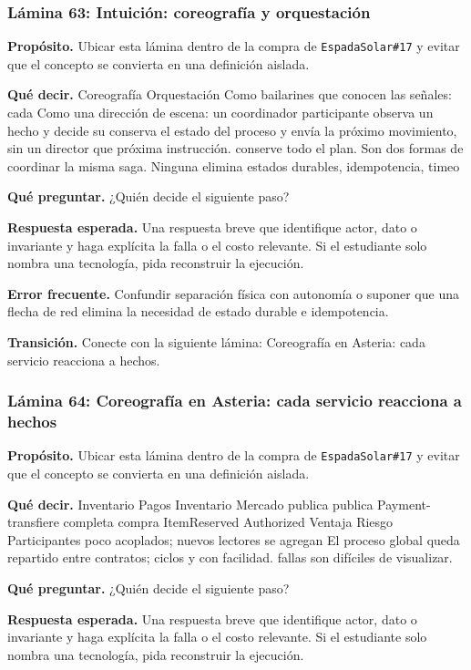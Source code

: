 \documentclass[variant=docente,cover=institutional,mode=screen]{ua-engineering-v6-article}
\begin{document}
\subsubsection*{Lámina 63: Intuición: coreografía y orquestación}
\textbf{Propósito.} Ubicar esta lámina dentro de la compra de \texttt{EspadaSolar\#17} y evitar que el concepto se convierta en una definición aislada.

\textbf{Qué decir.} Coreografía Orquestación Como bailarines que conocen las señales: cada Como una dirección de escena: un coordinador participante observa un hecho y decide su conserva el estado del proceso y envía la próximo movimiento, sin un director que próxima instrucción. conserve todo el plan. Son dos formas de coordinar la misma saga. Ninguna elimina estados durables, idempotencia, timeo

\textbf{Qué preguntar.} ¿Quién decide el siguiente paso?

\textbf{Respuesta esperada.} Una respuesta breve que identifique actor, dato o invariante y haga explícita la falla o el costo relevante. Si el estudiante solo nombra una tecnología, pida reconstruir la ejecución.

\textbf{Error frecuente.} Confundir separación física con autonomía o suponer que una flecha de red elimina la necesidad de estado durable e idempotencia.

\textbf{Transición.} Conecte con la siguiente lámina: Coreografía en Asteria: cada servicio reacciona a hechos.

\subsubsection*{Lámina 64: Coreografía en Asteria: cada servicio reacciona a hechos}
\textbf{Propósito.} Ubicar esta lámina dentro de la compra de \texttt{EspadaSolar\#17} y evitar que el concepto se convierta en una definición aislada.

\textbf{Qué decir.} Inventario Pagos Inventario Mercado publica publica Payment- transfiere completa compra ItemReserved Authorized Ventaja Riesgo Participantes poco acoplados; nuevos lectores se agregan El proceso global queda repartido entre contratos; ciclos y con facilidad. fallas son difíciles de visualizar.

\textbf{Qué preguntar.} ¿Quién decide el siguiente paso?

\textbf{Respuesta esperada.} Una respuesta breve que identifique actor, dato o invariante y haga explícita la falla o el costo relevante. Si el estudiante solo nombra una tecnología, pida reconstruir la ejecución.
\end{document}
